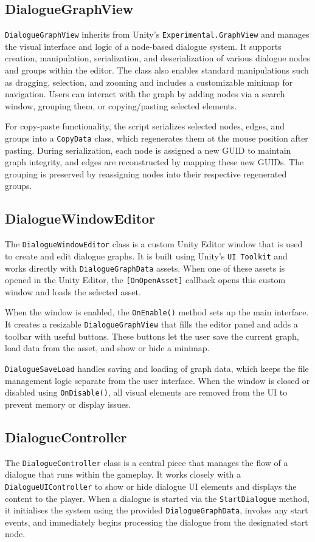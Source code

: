 \subsection{DialogueGraphView}
\verb|DialogueGraphView| inherits from Unity's \verb|Experimental.GraphView| and manages the visual interface and logic of a node-based dialogue system. It supports creation, manipulation, serialization, and deserialization of various dialogue nodes and groups within the editor. The class also enables standard manipulations such as dragging, selection, and zooming and includes a customizable minimap for navigation. Users can interact with the graph by adding nodes via a search window, grouping them, or copying/pasting selected elements. 

For copy-paste functionality, the script serializes selected nodes, edges, and groups into a \verb|CopyData| class, which regenerates them at the mouse position after pasting. During serialization, each node is assigned a new GUID to maintain graph integrity, and edges are reconstructed by mapping these new GUIDs. The grouping is preserved by reassigning nodes into their respective regenerated groups.

 
\subsection{DialogueWindowEditor}
The \verb|DialogueWindowEditor| class is a custom Unity Editor window that is used to create and edit dialogue graphs. It is built using Unity’s \verb|UI Toolkit| and works directly with \verb|DialogueGraphData| assets. When one of these assets is opened in the Unity Editor, the \verb|[OnOpenAsset]| callback opens this custom window and loads the selected asset.

When the window is enabled, the \verb|OnEnable()| method sets up the main interface. It creates a resizable \verb|DialogueGraphView| that fills the editor panel and adds a toolbar with useful buttons. These buttons let the user save the current graph, load data from the asset, and show or hide a minimap.

\verb|DialogueSaveLoad| handles saving and loading of graph data, which keeps the file management logic separate from the user interface. When the window is closed or disabled using \verb|OnDisable()|, all visual elements are removed from the UI to prevent memory or display issues.


\subsection{DialogueController }
The \verb|DialogueController| class is a central piece that manages the flow of a dialogue that runs within the gameplay. It works closely with a \verb|DialogueUIController| to show or hide dialogue UI elements and displays the content to the player. When a dialogue is started via the \verb|StartDialogue| method, it initialises the system using the provided \verb|DialogueGraphData|, invokes any start events, and immediately begins processing the dialogue from the designated start node.


